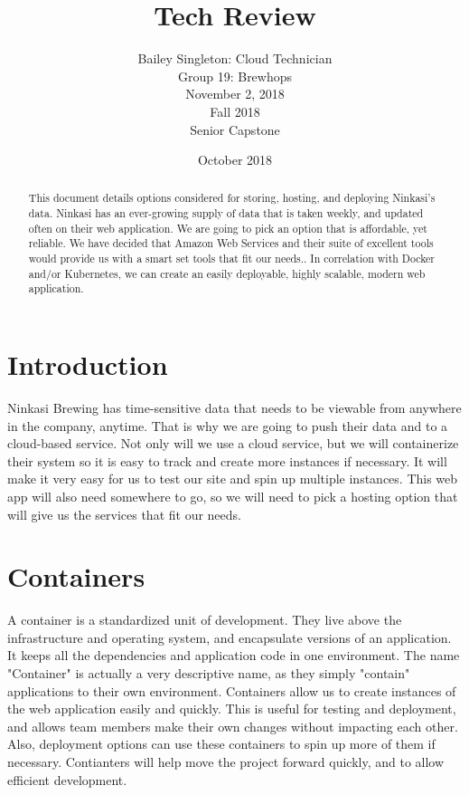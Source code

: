 \documentclass[10pt, draftclsnofoot, journal, onecolumn]{IEEEtran}
\title{Tech Review}
\author{Bailey Singleton: Cloud Technician \\ Group 19: Brewhops \\ November 2, 2018 \\ Fall 2018 \\ Senior Capstone }
\date{October 2018}
\begin{document}
\maketitle

\begin{abstract}
    This document details options considered for storing, hosting, and deploying Ninkasi's data.
    Ninkasi has an ever-growing supply of data that is taken weekly, and updated often on their web application. We are going to pick an option that is affordable, yet reliable. We have decided that Amazon Web Services and their suite of excellent tools would provide us with a smart set tools that fit our needs.. In correlation with Docker and/or Kubernetes, we can create an easily deployable, highly scalable, modern web application. 
\end{abstract}

\pagebreak

\section{Introduction}
    
    Ninkasi Brewing has time-sensitive data that needs to be viewable from anywhere in the company, anytime. That is why we are going to push their data and to a cloud-based service.
    Not only will we use a cloud service, but we will containerize their system so it is easy to track and create more instances if necessary. It will make it very easy for us to test our site and spin up multiple instances.  
    This web app will also need somewhere to go, so we will need to pick a hosting option that will give us the services that fit our needs. 
    
\section{Containers}
    A container is a standardized unit of development. They live above the infrastructure and operating system, and encapsulate versions of an application. 
    It keeps all the dependencies and application code in one environment. The name "Container" is actually a very descriptive name, as they simply "contain" applications to their own environment. 
    Containers allow us to create instances of the web application easily and quickly. 
    This is useful for testing and deployment, and allows team members make their own changes without impacting each other. 
    Also, deployment options can use these containers to spin up more of them if necessary. 
    Contianters will help move the project forward quickly, and to allow efficient development.
    
\end{document}
